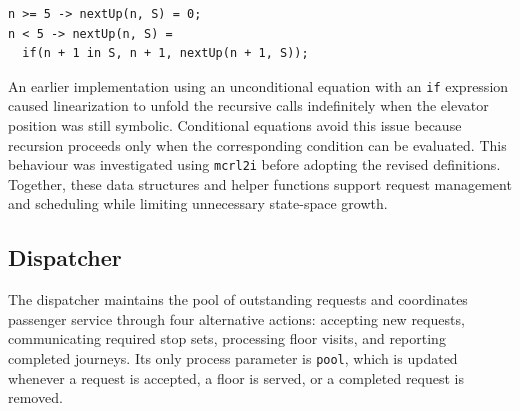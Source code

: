 \begin{lstlisting}
n >= 5 -> nextUp(n, S) = 0;
n < 5 -> nextUp(n, S) =
  if(n + 1 in S, n + 1, nextUp(n + 1, S));
\end{lstlisting}

An earlier implementation using an unconditional equation with an \texttt{if} expression caused linearization to unfold the recursive calls indefinitely when the elevator position was still symbolic. Conditional equations avoid this issue because recursion proceeds only when the corresponding condition can be evaluated. This behaviour was investigated using \texttt{mcrl2i} before adopting the revised definitions. Together, these data structures and helper functions support request management and scheduling while limiting unnecessary state-space growth.

\subsection{Dispatcher}
\label{subsec:dispatcher}

The dispatcher maintains the pool of outstanding requests and coordinates passenger service through four alternative actions: accepting new requests, communicating required stop sets, processing floor visits, and reporting completed journeys. Its only process parameter is \texttt{pool}, which is updated whenever a request is accepted, a floor is served, or a completed request is removed.


